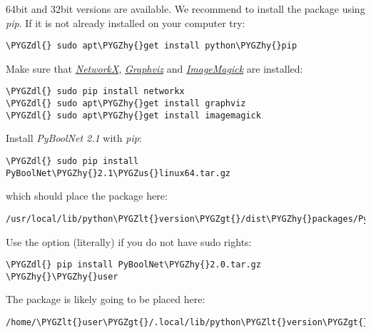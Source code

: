 \documentclass[letterpaper,10pt,english]{sphinxmanual}
\def\PYGZus{\char`\_}
\def\PYGZlt{\char`\<}
\def\PYGZgt{\char`\>}
\def\PYGZdl{\char`\$}
\def\PYGZhy{\char`\-}
\begin{document}
64bit and 32bit versions are available. We recommend to install the package using \emph{pip}. If it is not already installed on your computer try:

\begin{Verbatim}[commandchars=\\\{\}]
\PYGZdl{} sudo apt\PYGZhy{}get install python\PYGZhy{}pip
\end{Verbatim}

Make sure that {\hyperref[Installation:installation-networkx]{\emph{NetworkX}}}, {\hyperref[Installation:installation-graphviz]{\emph{Graphviz}}} and {\hyperref[Installation:installation-imagemagick]{\emph{ImageMagick}}} are installed:

\begin{Verbatim}[commandchars=\\\{\}]
\PYGZdl{} sudo pip install networkx
\PYGZdl{} sudo apt\PYGZhy{}get install graphviz
\PYGZdl{} sudo apt\PYGZhy{}get install imagemagick
\end{Verbatim}

Install \emph{PyBoolNet 2.1} with \emph{pip}:

\begin{Verbatim}[commandchars=\\\{\}]
\PYGZdl{} sudo pip install PyBoolNet\PYGZhy{}2.1\PYGZus{}linux64.tar.gz
\end{Verbatim}

which should place the package here:

\begin{Verbatim}[commandchars=\\\{\}]
/usr/local/lib/python\PYGZlt{}version\PYGZgt{}/dist\PYGZhy{}packages/PyBoolNet
\end{Verbatim}

Use the option  (literally) if you do not have sudo rights:

\begin{Verbatim}[commandchars=\\\{\}]
\PYGZdl{} pip install PyBoolNet\PYGZhy{}2.0.tar.gz \PYGZhy{}\PYGZhy{}user
\end{Verbatim}

The package is likely going to be placed here:

\begin{Verbatim}[commandchars=\\\{\}]
/home/\PYGZlt{}user\PYGZgt{}/.local/lib/python\PYGZlt{}version\PYGZgt{}/dist\PYGZhy{}packages/PyBoolNet
\end{Verbatim}
\end{document}
